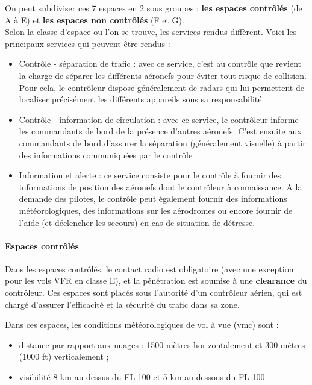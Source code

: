 		On peut subdiviser ces 7 espaces en 2 sous groupes : \textbf{les espaces contrôlés} (de A à E) et \textbf{les espaces non contrôlés} (F et G). \\
		
		Selon la classe d'espace ou l'on se trouve, les services rendus diffèrent. Voici les principaux services qui peuvent être rendus :
		\begin{itemize}
			\item Contrôle - séparation de trafic : avec ce service, c'est au contrôle que revient la charge de séparer les différents aéronefs pour éviter tout risque de collision. Pour cela, le contrôleur dispose généralement de radars qui lui permettent de localiser précisément les différents appareils sous sa responsabilité
			\item Contrôle - information de circulation : avec ce service, le contrôleur informe les commandants de bord de la présence d'autres aéronefs. C'est ensuite aux commandants de bord d'assurer la séparation (généralement visuelle) à partir des informations communiquées par le contrôle
			\item Information et alerte : ce service consiste pour le contrôle à fournir des informations de position des aéronefs dont le contrôleur à connaissance. A la demande des pilotes, le contrôle peut également fournir des informations météorologiques, des informations sur les aérodromes ou encore fournir de l'aide (et déclencher les secours) en cas de situation de détresse.
		\end{itemize}
		
		\paragraph{Espaces contrôlés}
		Dans les espaces contrôlés, le contact radio est obligatoire (avec une exception pour les vols VFR en classe E), et la pénétration est soumise à une \textbf{clearance} du contrôleur. Ces espaces sont placés sous l'autorité d'un contrôleur aérien, qui est chargé d'assurer l'efficacité et la sécurité du trafic dans sa zone.
		
		Dans ces espaces, les conditions météorologiques de vol à vue (\acrshort{vmc}) sont :
		\begin{itemize}
		\item distance par rapport aux nuages : 1500 mètres horizontalement et 300 mètres (1000 ft) verticalement ;
		\item visibilité 8 km au-dessus du FL 100 et 5 km au-dessous du FL 100. 
		\end{itemize}
		
